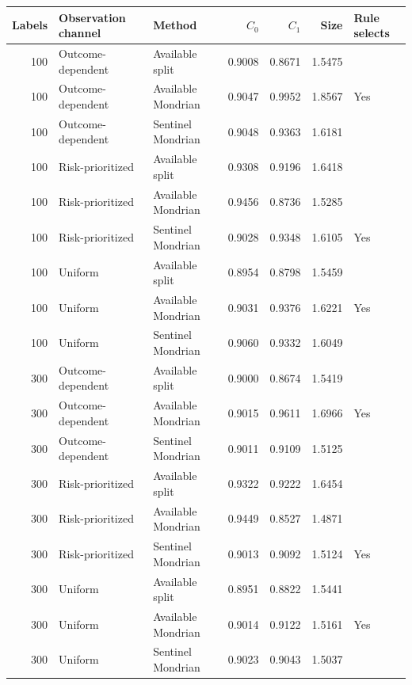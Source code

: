 \begin{tabular}{rllrrrl}
\toprule
Labels & Observation channel & Method & $C_0$ & $C_1$ & Size & Rule selects \\
\midrule
100 & Outcome-dependent & Available split & 0.9008 & 0.8671 & 1.5475 &  \\
100 & Outcome-dependent & Available Mondrian & 0.9047 & 0.9952 & 1.8567 & Yes \\
100 & Outcome-dependent & Sentinel Mondrian & 0.9048 & 0.9363 & 1.6181 &  \\
100 & Risk-prioritized & Available split & 0.9308 & 0.9196 & 1.6418 &  \\
100 & Risk-prioritized & Available Mondrian & 0.9456 & 0.8736 & 1.5285 &  \\
100 & Risk-prioritized & Sentinel Mondrian & 0.9028 & 0.9348 & 1.6105 & Yes \\
100 & Uniform & Available split & 0.8954 & 0.8798 & 1.5459 &  \\
100 & Uniform & Available Mondrian & 0.9031 & 0.9376 & 1.6221 & Yes \\
100 & Uniform & Sentinel Mondrian & 0.9060 & 0.9332 & 1.6049 &  \\
300 & Outcome-dependent & Available split & 0.9000 & 0.8674 & 1.5419 &  \\
300 & Outcome-dependent & Available Mondrian & 0.9015 & 0.9611 & 1.6966 & Yes \\
300 & Outcome-dependent & Sentinel Mondrian & 0.9011 & 0.9109 & 1.5125 &  \\
300 & Risk-prioritized & Available split & 0.9322 & 0.9222 & 1.6454 &  \\
300 & Risk-prioritized & Available Mondrian & 0.9449 & 0.8527 & 1.4871 &  \\
300 & Risk-prioritized & Sentinel Mondrian & 0.9013 & 0.9092 & 1.5124 & Yes \\
300 & Uniform & Available split & 0.8951 & 0.8822 & 1.5441 &  \\
300 & Uniform & Available Mondrian & 0.9014 & 0.9122 & 1.5161 & Yes \\
300 & Uniform & Sentinel Mondrian & 0.9023 & 0.9043 & 1.5037 &  \\
\bottomrule
\end{tabular}
